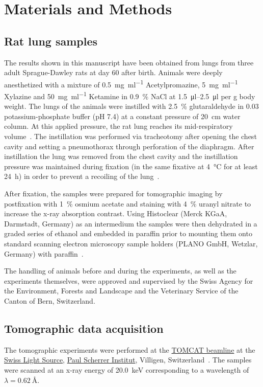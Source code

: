 \documentclass[%
	twoside,
	paper=a4,%
	abstract=true,%
	]{scrartcl}
\begin{document}
\section{Materials and Methods}
\label{sec:materials and methods}
\subsection{Rat lung samples}
The results shown in this manuscript have been obtained from lungs from three adult Sprague-Dawley rats at day 60 after birth. Animals were deeply anesthetized with a mixture of %
\SI{0.5}{\milli\gram\per\milli\litre} Acetylpromazine, %
\SI{5}{\milli\gram\per\milli\litre} Xylazine and %
\SI{50}{\milli\gram\per\milli\litre} Ketamine in %
\SI{0.9}{\percent} NaCl at \SIrange{1.5}{2.5}{\micro\litre} per \si{\gram} body weight. The lungs of the animals were instilled with \SI{2.5}{\percent} glutaraldehyde in \SI{0.03}{\Molar} potassium-phosphate buffer (pH 7.4) at a constant pressure of \SI{20}{\centi\meter} water column. At this applied pressure, the rat lung reaches its mid-respiratory volume~\cite{Schittny1998}. The instillation was performed via tracheotomy after opening the chest cavity and setting a pneumothorax through perforation of the diaphragm. After instillation the lung was removed from the chest cavity and the instillation pressure was maintained during fixation (in the same fixative at \SI{4}{\celsius} for at least \SI{24}{\hour}) in order to prevent a recoiling of the lung~\cite{Tschanz2002}.

After fixation, the samples were prepared for tomographic imaging by postfixation with \SI{1}{\percent} osmium acetate and staining with \SI{4}{\percent} uranyl nitrate to increase the x-ray absorption contrast. Using Histoclear (Merck KGaA, Darmstadt, Germany) as an intermedium the samples were then dehydrated in a graded series of ethanol and embedded in paraffin prior to mounting them onto standard scanning electron microscopy sample holders (PLANO GmbH, Wetzlar, Germany) with paraffin~\cite{Tsuda2008}.

The handling of animals before and during the experiments, as well as the experiments themselves, were approved and supervised by the Swiss Agency for the Environment, Forests and Landscape and the Veterinary Service of the Canton of Bern, Switzerland.

\subsection{Tomographic data acquisition}
The tomographic experiments were performed at the \href{http://www.psi.ch/sls/tomcat/}{TOMCAT beamline} at the \href{http://www.psi.ch/sls/}{Swiss Light Source}, \href{http://www.psi.ch/}{Paul Scherrer Institut}, Villigen, Switzerland~\cite{Stampanoni2006a}. The samples were scanned at an x-ray energy of \SI{20.0}{\kilo\electronvolt} corresponding to a wavelength of \(\lambda=\SI{0.62}{\angstrom}\). %
\end{document}
